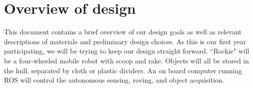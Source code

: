 \documentclass{paper}
\newcommand \robotName{Rockie} 		%
\begin{document}
\maketitle


\section*{Overview of design}

	This document contains a brief overview of our design goals as well as relevant descriptions of materials and preliminary design choices.  As this is our first year participating, we will be trying to keep our design straight forward.  ``\robotName" will be a four-wheeled mobile robot with scoop and rake.  Objects will all be stored in the hull, separated by cloth or plastic dividers.   An on board computer running ROS will control the autonomous sensing, roving, and object acquisition.   
\end{document}
